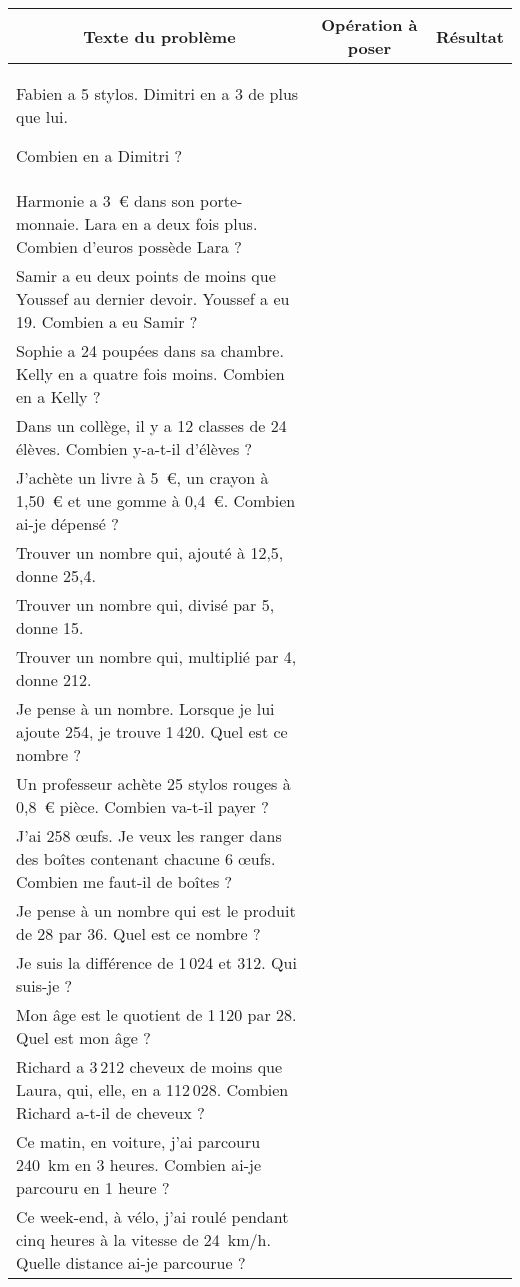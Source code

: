 \begin{tabular}{|m{13cm}|c|c|}
  \hline
\multicolumn{1}{|c|}{Texte du problème}&Opération à poser&Résultat\\
\hline
Fabien a 5 stylos. Dimitri en a 3 de plus que lui.\par Combien en a Dimitri ?&&\\
\hline
Harmonie a 3~\textgreek{\euro} dans son porte-monnaie. Lara en a deux fois plus. Combien d'euros possède Lara ?&&\\
\hline
Samir a eu deux points de moins que Youssef au dernier devoir. Youssef a eu 19. Combien a eu Samir ?&&\\
\hline
Sophie a 24 poupées dans sa chambre. Kelly en a quatre fois moins. Combien en a Kelly ?&&\\
\hline
Dans un collège, il y a 12 classes de 24 élèves. Combien y-a-t-il d'élèves ?&&\\
\hline
J'achète un livre à 5~\textgreek{\euro}, un crayon à 1,50~\textgreek{\euro} et une gomme à 0,4~\textgreek{\euro}. Combien ai-je dépensé ?&&\\
\hline
Trouver un nombre qui, ajouté à 12,5, donne 25,4.&&\\
\hline
Trouver un nombre qui, divisé par 5, donne 15.&&\\
\hline
Trouver un nombre qui, multiplié par 4, donne 212.&&\\
\hline
Je pense à un nombre. Lorsque je lui ajoute 254, je trouve 1\,420. Quel est ce nombre ?&&\\
\hline
Un professeur achète 25 stylos rouges à 0,8~\textgreek{\euro} pièce. Combien va-t-il payer ?&&\\
\hline
J'ai 258 \oe ufs. Je veux les ranger dans des boîtes contenant chacune 6 \oe ufs. Combien me faut-il de boîtes ?&&\\
\hline
Je pense à un nombre qui est le produit de 28 par 36. Quel est ce nombre ?&&\\
\hline
Je suis la différence de 1\,024 et 312. Qui suis-je ?&&\\
\hline
Mon âge est le quotient de 1\,120 par 28. Quel est mon âge ?&&\\
\hline
Richard a 3\,212 cheveux de moins que Laura, qui, elle, en a 112\,028. Combien Richard a-t-il de cheveux ?&&\\
\hline
Ce matin, en voiture, j'ai parcouru 240~km en 3 heures. Combien ai-je parcouru en 1 heure ?&&\\
\hline
Ce week-end, à vélo, j'ai roulé pendant cinq heures à la vitesse de 24~km/h. Quelle distance ai-je parcourue ?&&\\

\end{tabular}
